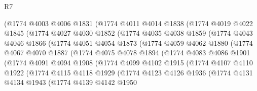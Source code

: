 \begin{lexlean}{R7}
\begin{coremodule}
            (@1774
              @4003
              @4006
              @1831
              (@1774
                @4011
                @4014
                @1838
                (@1774
                  @4019
                  @4022
                  @1845
                  (@1774
                    @4027
                    @4030
                    @1852
                    (@1774
                      @4035
                      @4038
                      @1859
                      (@1774
                        @4043
                        @4046
                        @1866
                        (@1774
                          @4051
                          @4054
                          @1873
                          (@1774
                            @4059
                            @4062
                            @1880
                            (@1774
                              @4067
                              @4070
                              @1887
                              (@1774
                                @4075
                                @4078
                                @1894
                                (@1774
                                  @4083
                                  @4086
                                  @1901
                                  (@1774
                                    @4091
                                    @4094
                                    @1908
                                    (@1774
                                      @4099
                                      @4102
                                      @1915
                                      (@1774
                                        @4107
                                        @4110
                                        @1922
                                        (@1774
                                          @4115
                                          @4118
                                          @1929
                                          (@1774
                                            @4123
                                            @4126
                                            @1936
                                            (@1774
                                              @4131
                                              @4134
                                              @1943
                                              (@1774
                                                @4139
                                                @4142
                                                @1950

\end{coremodule}
\end{lexlean}
